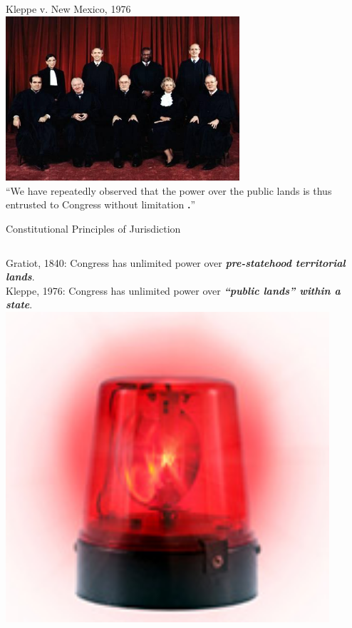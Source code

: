 \begin{frame}{Kleppe v. New Mexico, 1976}
    \centering
    \includegraphics[width=0.65\textwidth]{img/sc-1976.png} \\
    ``We have repeatedly observed that the power over the public lands is thus entrusted to Congress without limitation{ \huge \color{red} \textbf{.}}''
\end{frame}

\begin{frame}{Constitutional Principles of Jurisdiction}
    \begin{columns}[onlytextwidth]
            { \large
            Gratiot, 1840: Congress has unlimited power over \textbf{\emph{pre-statehood territorial lands}}. \\
            \vspace{20pt}
            Kleppe, 1976: Congress has unlimited power over \textbf{\emph{``public lands'' within a state}}. \\
            }
            \centering
            \includegraphics[width=0.9\textwidth]{img/red-light.png} \\
    \end{columns}
\end{frame}


